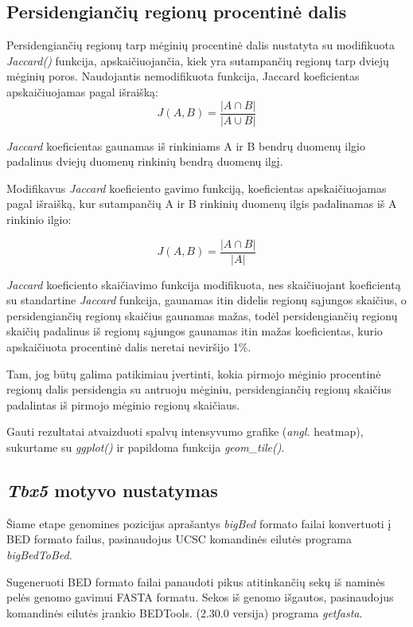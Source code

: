 \documentclass[12pt]{article}
\begin{document}
\subsection{Persidengiančių regionų procentinė dalis}
Persidengiančių regionų tarp mėginių procentinė dalis nustatyta
su modifikuota \emph{Jaccard()} funkcija, apskaičiuojančia,
kiek yra sutampančių regionų tarp dviejų mėginių poros.
Naudojantis nemodifikuota funkcija, Jaccard koeficientas
apskaičiuojamas pagal išraišką:
\[ J(A, B) =  \frac{|A \cap B|}{|A \cup B|} \]

\emph{Jaccard} koeficientas gaunamas iš rinkiniams A ir B bendrų duomenų ilgio
padalinus dviejų duomenų rinkinių bendrą duomenų ilgį.

Modifikavus \emph{Jaccard} koeficiento gavimo funkciją, koeficientas
apskaičiuojamas pagal išraišką, kur sutampančių A ir B rinkinių
duomenų ilgis padalinamas iš A rinkinio ilgio:

\[ J(A, B) = \frac{|A \cap B|}{|A|} \]

\emph{Jaccard} koeficiento skaičiavimo funkcija modifikuota, nes
skaičiuojant koeficientą su standartine \emph{Jaccard} funkcija,
gaunamas itin didelis regionų sąjungos skaičius, o
persidengiančių regionų skaičius gaunamas mažas, todėl
persidengiančių regionų skaičių padalinus iš regionų sąjungos
gaunamas itin mažas koeficientas, kurio apskaičiuota procentinė
dalis neretai neviršijo 1\%.

Tam, jog būtų galima patikimiau įvertinti, kokia pirmojo mėginio
procentinė regionų dalis persidengia su antruoju mėginiu,
persidengiančių regionų skaičius padalintas iš pirmojo mėginio
regionų skaičiaus.

Gauti rezultatai atvaizduoti spalvų intensyvumo grafike (\emph{angl.}
heatmap), sukurtame su \emph{ggplot()} ir papildoma funkcija
\emph{geom\_tile()}.

\subsection{\emph{Tbx5} motyvo nustatymas}
Šiame etape genomines pozicijas aprašantys \emph{bigBed} formato
failai konvertuoti į BED formato failus, pasinaudojus
UCSC komandinės eilutės programa \emph{bigBedToBed}\cite
{BBTOBED}.

Sugeneruoti BED formato failai panaudoti pikus atitinkančių
sekų iš naminės pelės genomo gavimui FASTA formatu.
Sekos iš genomo išgautos, pasinaudojus komandinės eilutės įrankio
BEDTools\cite{BEDTOOLS}.
(2.30.0 versija) programa \emph{getfasta}\cite{GET_FASTA}.
\end{document}
